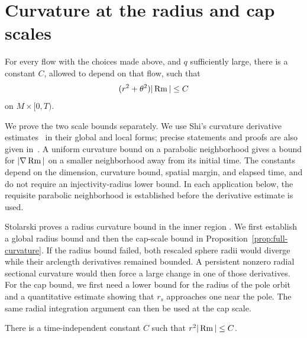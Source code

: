\section{Curvature at the radius and cap scales}\label{sec:cap}

\begin{proposition}\label{prop:full-curvature}
For every flow with the choices made above, and \(q\) sufficiently large,
there is a constant \(C\), allowed to depend on that flow, such that
\begin{equation}\label{eq:full-curvature}
(r^2+\theta^2)|\operatorname{Rm}|\le C
\end{equation}
on \(M\times[0,T)\).
\end{proposition}

We prove the two scale bounds separately. We use Shi's curvature derivative
estimates~\cite{Shi1989} in their global and local forms; precise statements
and proofs are also given in~\cite[Theorems~1.4.1--1.4.2]{CaoZhu2006}.
A uniform curvature
bound on a parabolic neighborhood gives a bound for \(|\nabla\operatorname{Rm}|\) on a
smaller neighborhood away from its initial time. The constants depend on
the dimension, curvature bound, spatial margin, and elapsed time, and do
not require an injectivity-radius lower bound. In each application below,
the requisite parabolic neighborhood is established before the derivative
estimate is used.

Stolarski proves a radius curvature bound in the inner region
\cite[Proposition~5.1(3)]{Stolarski2019}. We first establish a global
radius bound and then the cap-scale bound in
Proposition~\ref{prop:full-curvature}.
If the radius bound failed, both rescaled sphere radii
would diverge while their arclength derivatives remained bounded. A
persistent nonzero radial sectional curvature would then force a large
change in one of those derivatives. For the cap bound, we first need a
lower bound for the radius of the pole orbit and a quantitative estimate
showing that \(r_s\) approaches one near the pole. The same radial
integration argument can then be used at the cap scale.

\begin{lemma}\label{lem:r-curvature}
There is a time-independent constant \(C\) such that \(r^2|\operatorname{Rm}|\le C\).
\end{lemma}

